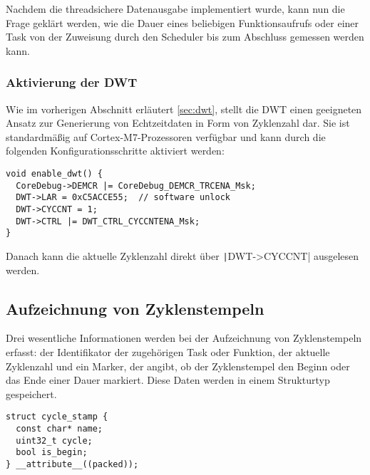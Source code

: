 Nachdem die threadsichere Datenausgabe implementiert wurde, kann nun die Frage
geklärt werden, wie die Dauer eines beliebigen Funktionsaufrufs oder einer Task
von der Zuweisung durch den Scheduler bis zum Abschluss gemessen werden kann.

\subsubsection{Aktivierung der DWT}

Wie im vorherigen Abschnitt erläutert \ref{sec:dwt}, stellt die DWT einen
geeigneten Ansatz zur Generierung von Echtzeitdaten in Form von Zyklenzahl dar.
Sie ist standardmäßig auf Cortex-M7-Prozessoren verfügbar und kann durch die
folgenden Konfigurationsschritte aktiviert werden:

\begin{code}
\begin{verbatim}
void enable_dwt() {
  CoreDebug->DEMCR |= CoreDebug_DEMCR_TRCENA_Msk;
  DWT->LAR = 0xC5ACCE55;  // software unlock
  DWT->CYCCNT = 1;
  DWT->CTRL |= DWT_CTRL_CYCCNTENA_Msk;
}
\end{verbatim}
\end{code}

Danach kann die aktuelle Zyklenzahl direkt über \texttt|DWT->CYCCNT|
ausgelesen werden.

\subsection{Aufzeichnung von Zyklenstempeln}

Drei wesentliche Informationen werden bei der Aufzeichnung von Zyklenstempeln
erfasst: der Identifikator der zugehörigen Task oder Funktion, der aktuelle
Zyklenzahl und ein Marker, der angibt, ob der Zyklenstempel den Beginn oder das
Ende einer Dauer markiert. Diese Daten werden in einem Strukturtyp gespeichert.

\begin{code}
\begin{verbatim}
struct cycle_stamp {
  const char* name;
  uint32_t cycle;
  bool is_begin;
} __attribute__((packed));
\end{verbatim}
\end{code}


